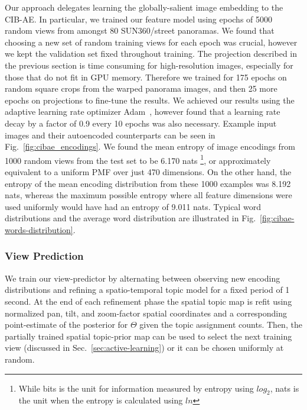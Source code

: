 Our approach delegates learning the globally-salient image embedding to the CIB-AE. In particular, we trained our feature model using epochs of 5000 random views from amongst 80 SUN360/street panoramas. We found that choosing a new set of random training views for each epoch was crucial, however we kept the validation set fixed throughout training. The projection described in the previous section is time consuming for high-resolution images, especially for those that do not fit in GPU memory. Therefore we trained for 175 epochs on random square crops from the warped panorama images, and then 25 more epochs on projections to fine-tune the results. We achieved our results using the adaptive learning rate optimizer Adam~\citep{KingmaAdam}, however found that a learning rate decay by a factor of 0.9 every 10 epochs was also necessary. Example input images and their autoencoded counterparts can be seen in Fig.~\ref{fig:cibae_encodings}. We found the mean entropy of image encodings from 1000 random views from the test set to be 6.170 nats \footnote{While bits is the unit for information measured by entropy using $log_2$, nats is the unit when the entropy is calculated using $ln$}, or approximately equivalent to a uniform PMF over just 470 dimensions. On the other hand, the entropy of the mean encoding distribution from these 1000 examples was 8.192 nats, whereas the maximum possible entropy where all feature dimensions were used uniformly would have had an entropy of 9.011 nats. Typical word distributions and the average word distribution are illustrated in Fig.~\ref{fig:cibae-words-distribution}.

\subsubsection{View Prediction}
We train our view-predictor by alternating between observing new encoding distributions and refining a spatio-temporal topic model for a fixed period of 1 second. At the end of each refinement phase the spatial topic map is refit using normalized pan, tilt, and zoom-factor spatial coordinates and a corresponding point-estimate of the posterior for $\Theta$ given the topic assignment counts. Then, the partially trained spatial topic-prior map can be used to select the next training view (discussed in Sec.~\ref{sec:active-learning}) or it can be chosen uniformly at random.

